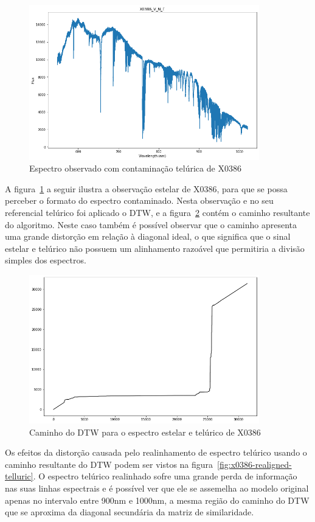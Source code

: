 \begin{figure}[htb]
\centering
\includegraphics[width=10cm]{figuras/x0386_v_n_e_spectrum.png}
\caption{Espectro observado com contaminação telúrica de X0386}
\label{fig:x0386-v-n-e}
\end{figure}

A figura~\ref{fig:x0386-v-n-e} a seguir ilustra a observação estelar de X0386, para que se possa perceber o formato do espectro contaminado.
Nesta observação e no seu referencial telúrico foi aplicado o DTW, e a figura~\ref{fig:x0386-warp-path} contém o caminho resultante do algoritmo. Neste caso também é possível observar que o caminho apresenta uma grande distorção em relação à diagonal ideal, o que significa que o sinal estelar e telúrico não possuem um alinhamento razoável que permitiria a divisão simples dos espectros.

\begin{figure}[htb]
\centering
\includegraphics[width=10cm]{figuras/x0386_warp_path.png}
\caption{Caminho do DTW para o espectro estelar e telúrico de X0386}
\label{fig:x0386-warp-path}
\end{figure}

Os efeitos da distorção causada pelo realinhamento de espectro telúrico usando o caminho resultante do DTW podem ser vistos na figura~\ref{fig:x0386-realigned-telluric}. O espectro telúrico realinhado sofre uma grande perda de informação nas suas linhas espectrais e é possível ver que ele se assemelha ao modelo original apenas no intervalo entre 900nm e 1000nm, a mesma região do caminho do DTW que se aproxima da diagonal secundária da matriz de similaridade.

